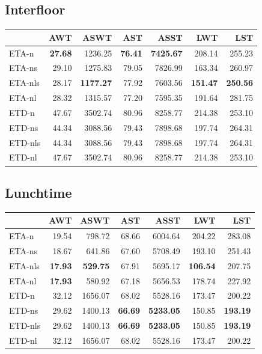 \documentclass{UoYCSproject}
\begin{document}
\begin{appendices}
\subsection{Interfloor}
\begin{tabular}{l | r r r r r r}
	& AWT & ASWT & AST & ASST & LWT & LST \\
	\hline
    ETA-n & \textbf{27.68} & 1236.25 & \textbf{76.41} & \textbf{7425.67} & 208.14 & 255.23 \\
    ETA-ns & 29.10 & 1275.83 & 79.05 & 7826.99 & 163.34 & 260.97 \\
    ETA-nls & 28.17 & \textbf{1177.27} & 77.92 & 7603.56 & \textbf{151.47} & \textbf{250.56} \\
    ETA-nl & 28.32 & 1315.57 & 77.20 & 7595.35 & 191.64 & 281.75 \\
    ETD-n & 47.67 & 3502.74 & 80.96 & 8258.77 & 214.38 & 253.10 \\
    ETD-ns & 44.34 & 3088.56 & 79.43 & 7898.68 & 197.74 & 264.31 \\
    ETD-nls & 44.34 & 3088.56 & 79.43 & 7898.68 & 197.74 & 264.31 \\
    ETD-nl & 47.67 & 3502.74 & 80.96 & 8258.77 & 214.38 & 253.10
\end{tabular}

\subsection{Lunchtime}
\begin{tabular}{l | r r r r r r}
	& AWT & ASWT & AST & ASST & LWT & LST \\
	\hline
    ETA-n & 19.54 & 798.72 & 68.66 & 6004.64 & 204.22 & 283.08 \\
    ETA-ns & 18.67 & 641.86 & 67.60 & 5708.49 & 193.10 & 251.43 \\
    ETA-nls & \textbf{17.93} & \textbf{529.75} & 67.91 & 5695.17 & \textbf{106.54} & 207.75 \\
    ETA-nl & \textbf{17.93} & 580.92 & 67.18 & 5656.53 & 178.74 & 227.92 \\
    ETD-n & 32.12 & 1656.07 & 68.02 & 5528.16 & 173.47 & 200.22 \\
    ETD-ns & 29.62 & 1400.13 & \textbf{66.69} & \textbf{5233.05} & 150.85 & \textbf{193.19} \\
    ETD-nls & 29.62 & 1400.13 & \textbf{66.69} & \textbf{5233.05} & 150.85 & \textbf{193.19} \\
    ETD-nl & 32.12 & 1656.07 & 68.02 & 5528.16 & 173.47 & 200.22
\end{tabular}


\end{appendices}
\end{document}
